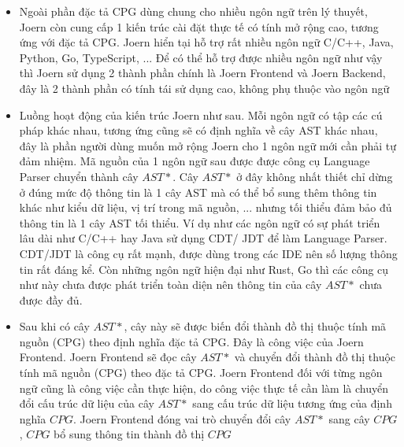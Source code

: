 \begin{itemize}
  \item Ngoài phần đặc tả CPG dùng chung cho nhiều ngôn ngữ trên lý thuyết, Joern còn cung cấp 1 kiến trúc cài đặt thực tế có tính mở rộng cao, tương ứng với đặc tả CPG. Joern hiển tại hỗ trợ rất nhiều ngôn ngữ C/C++, Java, Python, Go, TypeScript, ... Để có thể hỗ trợ được nhiều ngôn ngữ như vậy thì Joern sử dụng 2 thành phần chính là Joern Frontend và Joern Backend, đây là 2 thành phần có tính tái sử dụng cao, không phụ thuộc vào ngôn ngữ
  \item Luồng hoạt động của kiến trúc Joern như sau. Mỗi ngôn ngữ có tập các cú pháp khác nhau, tương ứng cũng sẽ có định nghĩa về cây AST khác nhau, đây là phần người dùng muốn mở rộng Joern cho 1 ngôn ngữ mới cần phải tự đảm nhiệm. Mã nguồn của 1 ngôn ngữ sau được được công cụ Language Parser chuyển thành cây $AST*$. Cây $AST*$ ở đây không nhất thiết chỉ dừng ở đúng mức độ thông tin là 1 cây AST mà có thể bổ sung thêm thông tin khác như kiểu dữ liệu, vị trí trong mã nguồn, ... nhưng tối thiểu đảm bảo đủ thông tin là 1 cây AST tối thiểu. Ví dụ như các ngôn ngữ có sự phát triển lâu dài như C/C++ hay Java sử dụng CDT/ JDT để làm Language Parser. CDT/JDT là công cụ rất mạnh, được dùng trong các IDE nên số lượng thông tin rất đáng kể. Còn những ngôn ngữ hiện đại như Rust, Go thì các công cụ như này chưa được phát triển toàn diện nên thông tin của cây $AST*$ chưa được đầy đủ. \item Sau khi có cây $AST*$, cây này sẽ được biến đổi thành đồ thị thuộc tính mã nguồn (CPG) theo định nghĩa đặc tả CPG. Đây là công việc của Joern Frontend. Joern Frontend sẽ đọc cây $AST*$ và chuyển đổi thành đồ thị thuộc tính mã nguồn (CPG) theo đặc tả CPG. Joern Frontend đối với từng ngôn ngữ cũng là công việc cần thực hiện, do công việc thực tế cần làm là chuyển đổi cấu trúc dữ liệu của cây $AST*$ sang cấu trúc dữ liệu tương ứng của định nghĩa $CPG$. Joern Frontend đóng vai trò chuyển đổi cây $AST*$ sang cây $CPG$, $CPG$ bổ sung thông tin thành đồ thị $CPG$

\end{itemize}
